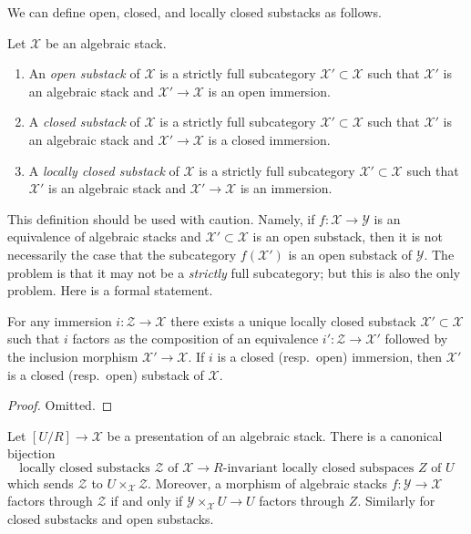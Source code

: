 \noindent
We can define open, closed, and locally closed substacks as follows.

\begin{definition}
\label{definition-substacks}
Let $\mathcal{X}$ be an algebraic stack.
\begin{enumerate}
\item An {\it open substack} of $\mathcal{X}$ is a strictly full subcategory
$\mathcal{X}' \subset \mathcal{X}$ such that $\mathcal{X}'$ is an algebraic
stack and $\mathcal{X}' \to \mathcal{X}$ is an open immersion.
\item A {\it closed substack} of $\mathcal{X}$ is a strictly full subcategory
$\mathcal{X}' \subset \mathcal{X}$ such that $\mathcal{X}'$ is an algebraic
stack and $\mathcal{X}' \to \mathcal{X}$ is a closed immersion.
\item A {\it locally closed substack} of $\mathcal{X}$ is a strictly full
subcategory $\mathcal{X}' \subset \mathcal{X}$ such that $\mathcal{X}'$
is an algebraic stack and $\mathcal{X}' \to \mathcal{X}$ is an immersion.
\end{enumerate}
\end{definition}

\noindent
This definition should be used with caution. Namely, if
$f : \mathcal{X} \to \mathcal{Y}$ is an equivalence of algebraic stacks
and $\mathcal{X}' \subset \mathcal{X}$ is an open substack, then it
is not necessarily the case that the subcategory $f(\mathcal{X}')$
is an open substack of $\mathcal{Y}$. The problem is that it may not
be a {\it strictly} full subcategory; but this is also the only problem.
Here is a formal statement.

\begin{lemma}
\label{lemma-substack-image}
For any immersion $i : \mathcal{Z} \to \mathcal{X}$ there exists a
unique locally closed substack $\mathcal{X}' \subset \mathcal{X}$
such that $i$ factors as the composition of
an equivalence $i' : \mathcal{Z} \to \mathcal{X}'$
followed by the inclusion morphism $\mathcal{X}' \to \mathcal{X}$.
If $i$ is a closed (resp.\ open) immersion, then $\mathcal{X}'$
is a closed (resp.\ open) substack of $\mathcal{X}$.
\end{lemma}

\begin{proof}
Omitted.
\end{proof}

\begin{lemma}
\label{lemma-substacks-presentation}
Let $[U/R] \to \mathcal{X}$ be a presentation of an algebraic stack.
There is a canonical bijection
$$
\text{locally closed substacks }\mathcal{Z}\text{ of }\mathcal{X}
\longrightarrow
R\text{-invariant locally closed subspaces }Z\text{ of }U
$$
which sends $\mathcal{Z}$ to $U \times_\mathcal{X} \mathcal{Z}$.
Moreover, a morphism of algebraic stacks $f : \mathcal{Y} \to \mathcal{X}$
factors through $\mathcal{Z}$ if and only if
$\mathcal{Y} \times_\mathcal{X} U \to U$ factors through $Z$.
Similarly for closed substacks and open substacks.
\end{lemma}

